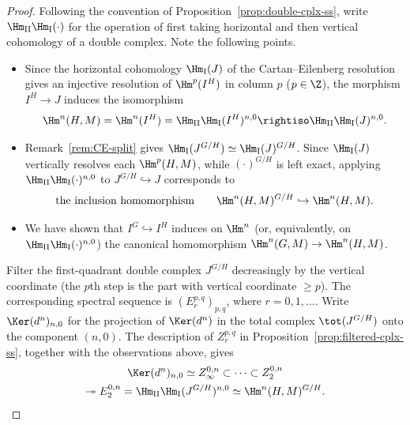 \begin{proof}
	Following the convention of Proposition~\ref{prop:double-cplx-ss}, write
	$\Hm_{\mathrm{II}}\Hm_{\mathrm{I}}(\cdot)$ for the operation of first
	taking horizontal and then vertical cohomology of a double complex. Note
	the following points.
	\begin{itemize}
		\item Since the horizontal cohomology $\Hm_{\mathrm{I}}(J)$ of the
		Cartan--Eilenberg resolution gives an injective resolution of
		$\Hm^p(I^H)$ in column $p$ ($p\in\Z$), the morphism $I^H\to J$ induces
		the isomorphism
		\[ \Hm^n(H,M)=\Hm^n(I^H)
		=\Hm_{\mathrm{II}}\Hm_{\mathrm{I}}(I^H)^{n,0}
		\rightiso\Hm_{\mathrm{II}}\Hm_{\mathrm{I}}(J)^{n,0}. \]
		\item Remark~\ref{rem:CE-split} gives
		$\Hm_{\mathrm{I}}(J^{G/H})\simeq\Hm_{\mathrm{I}}(J)^{G/H}$. Since
		$\Hm_{\mathrm{I}}(J)$ vertically resolves each $\Hm^p(H,M)$, while
		$(\cdot)^{G/H}$ is left exact, applying
		$\Hm_{\mathrm{II}}\Hm_{\mathrm{I}}(\cdot)^{n,0}$ to
		$J^{G/H}\hookrightarrow J$ corresponds to
		\[ \text{the inclusion homomorphism}\qquad
		\Hm^n(H,M)^{G/H}\hookrightarrow\Hm^n(H,M). \]
		\item We have shown that $I^G\hookrightarrow I^H$ induces on $\Hm^n$
		(or, equivalently, on
		$\Hm_{\mathrm{II}}\Hm_{\mathrm{I}}(\cdot)^{n,0}$) the canonical
		homomorphism $\Hm^n(G,M)\to\Hm^n(H,M)$.
	\end{itemize}

	Filter the first-quadrant double complex $J^{G/H}$ decreasingly by the
	vertical coordinate (the $p$th step is the part with vertical coordinate
	$\geq p$). The corresponding spectral sequence is
	$(E_r^{p,q})_{p,q}$, where $r=0,1,\ldots$. Write $\Ker(d^n)_{n,0}$ for
	the projection of $\Ker(d^n)$ in the total complex $\tot(J^{G/H})$ onto
	the component $(n,0)$. The description of $Z_r^{p,q}$ in
	Proposition~\ref{prop:filtered-cplx-ss}, together with the observations
	above, gives
	\begin{multline}\label{eqn:LHS-SS-aux1}
		\Ker(d^n)_{n,0}\simeq Z_\infty^{0,n}
		\subset\cdots\subset Z_2^{0,n}\\
		\twoheadrightarrow E_2^{0,n}
		=\Hm_{\mathrm{II}}\Hm_{\mathrm{I}}(J^{G/H})^{n,0}
		\simeq\Hm^n(H,M)^{G/H}.
	\end{multline}


\end{proof}
